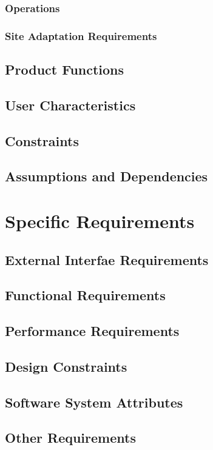 \documentclass[12pt,a4paper,landscape]{report}
\begin{document}
		\subsubsection{Operations}
		\subsubsection{Site Adaptation Requirements}
	\subsection{Product Functions}
	\subsection{User Characteristics}
	\subsection{Constraints}
	\subsection{Assumptions and Dependencies}
	
\section{Specific Requirements}
	\subsection{External Interfae Requirements}
	\subsection{Functional Requirements}
	\subsection{Performance Requirements}
	\subsection{Design Constraints}
	\subsection{Software System Attributes}
	\subsection{Other Requirements}
\end{document}
